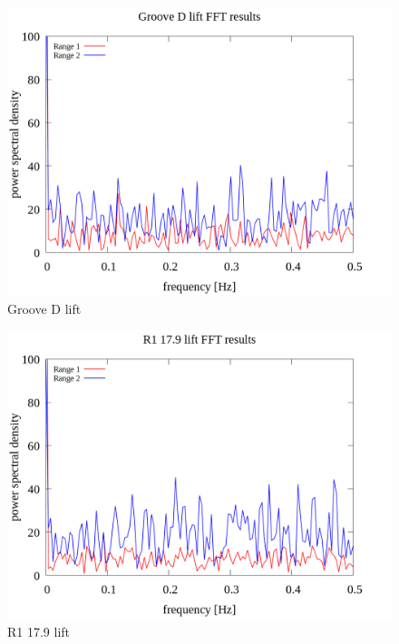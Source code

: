 \documentclass[a4paper]{jsarticle}
\begin{document}
\begin{figure}[htbp]
    \footnotesize
    \begin{center}
        \includegraphics[width=130mm]{../images/Groove_D_lift_08.png}
        \caption{Groove D lift}
    \end{center}
\end{figure}

\begin{figure}[htbp]
    \footnotesize
    \begin{center}
        \includegraphics[width=130mm]{../images/R1_17.9_lift_08.png}
        \caption{R1 17.9 lift}
    \end{center}
\end{figure}
\end{document}
